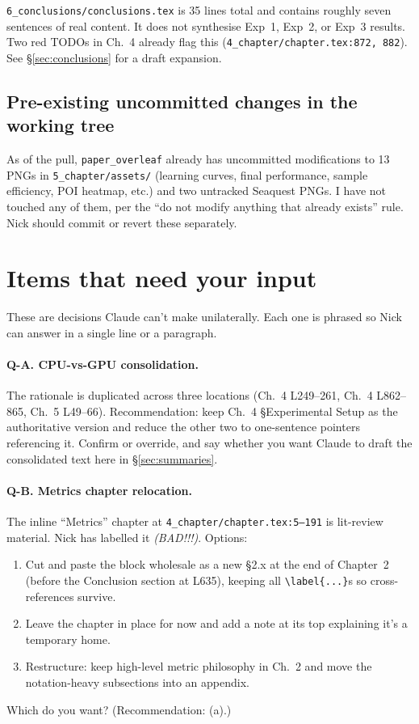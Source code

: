 \documentclass[11pt,a4paper]{article}
\newcommand{\fileline}[1]{\texttt{\small #1}}
\newcommand{\qlabel}[1]{\textbf{\color{blue!50!black} Q-#1.}}
\begin{document}
\fileline{6\_conclusions/conclusions.tex} is 35 lines total and contains
roughly seven sentences of real content. It does not synthesise Exp~1,
Exp~2, or Exp~3 results. Two red TODOs in Ch.~4 already flag this
(\fileline{4\_chapter/chapter.tex:872, 882}). See \S\ref{sec:conclusions}
for a draft expansion.

\subsection*{Pre-existing uncommitted changes in the working tree}

As of the pull, \fileline{paper\_overleaf} already has uncommitted
modifications to 13 PNGs in \fileline{5\_chapter/assets/} (learning curves,
final performance, sample efficiency, POI heatmap, etc.) and two untracked
Seaquest PNGs. I have not touched any of them, per the ``do not modify
anything that already exists'' rule. Nick should commit or revert these
separately.

\section{Items that need your input}\label{sec:questions}

These are decisions Claude can't make unilaterally. Each one is phrased so
Nick can answer in a single line or a paragraph.

\paragraph{\qlabel{A} CPU-vs-GPU consolidation.}
The rationale is duplicated across three locations (Ch.~4 L249--261, Ch.~4
L862--865, Ch.~5 L49--66). Recommendation: keep Ch.~4 \S Experimental
Setup as the authoritative version and reduce the other two to one-sentence
pointers referencing it. Confirm or override, and say whether you want
Claude to draft the consolidated text here in \S\ref{sec:summaries}.

\paragraph{\qlabel{B} Metrics chapter relocation.}
The inline ``Metrics'' chapter at \fileline{4\_chapter/chapter.tex:5--191}
is lit-review material. Nick has labelled it \emph{(BAD!!!)}. Options:
\begin{enumerate}[label=(\alph*),leftmargin=*]
  \item Cut and paste the block wholesale as a new \S2.x at the end of
  Chapter~2 (before the Conclusion section at L635), keeping all
  \fileline{\textbackslash label\{...\}}s so cross-references survive.
  \item Leave the chapter in place for now and add a note at its top
  explaining it's a temporary home.
  \item Restructure: keep high-level metric philosophy in Ch.~2 and move
  the notation-heavy subsections into an appendix.
\end{enumerate}
Which do you want? (Recommendation: (a).)
\end{document}
